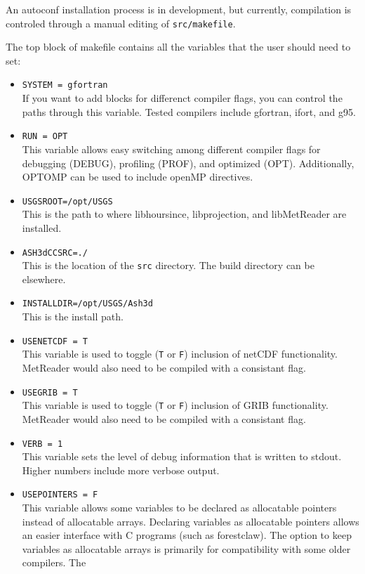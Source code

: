 An autoconf installation process is in development, but currently,
compilation is controled through a manual editing of 
\texttt{src/makefile}.

The top block of makefile contains all the variables that the user should
need to set:
\begin{itemize}
 \item \texttt{SYSTEM = gfortran}\\
If you want to add blocks for differenct compiler flags, you can control
the paths through this variable.  Tested compilers include gfortran, ifort,
and g95.
 \item \texttt{RUN = OPT}\\
This variable allows easy switching among different compiler flags for debugging (DEBUG),
profiling (PROF), and optimized (OPT).  Additionally, OPTOMP can be used to include
openMP directives.
 \item \texttt{USGSROOT=/opt/USGS}\\
This is the path to where libhoursince, libprojection, and libMetReader are installed.
 \item \texttt{ASH3dCCSRC=./}\\
This is the location of the \texttt{src} directory.  The build directory can be
elsewhere.
 \item \texttt{INSTALLDIR=/opt/USGS/Ash3d}\\
This is the install path.
 \item \texttt{USENETCDF = T}\\
This variable is used to toggle (\texttt{T} or \texttt{F}) inclusion of netCDF
functionality.  MetReader would also need to be compiled with a consistant flag.
 \item \texttt{USEGRIB   = T}\\
This variable is used to toggle (\texttt{T} or \texttt{F}) inclusion of GRIB
functionality.  MetReader would also need to be compiled with a consistant flag.
 \item \texttt{VERB = 1}\\
This variable sets the level of debug information that is written to stdout.  Higher
numbers include more verbose output.
 \item \texttt{USEPOINTERS = F}\\
This variable allows some variables to be declared as allocatable pointers instead
of allocatable arrays.  Declaring variables as allocatable pointers allows an easier
interface with C programs (such as forestclaw).  The option to keep variables as
allocatable arrays is primarily for compatibility with some older compilers.  The

\end{itemize}
